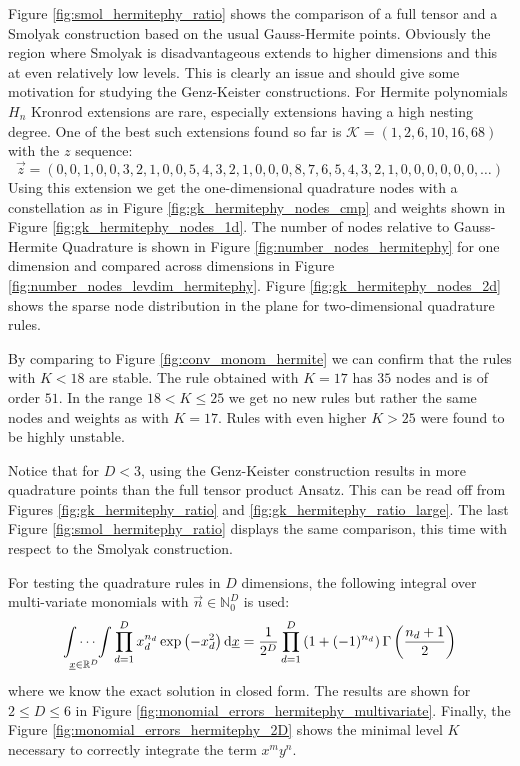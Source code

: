 \documentclass[a4paper,10pt]{article}
\begin{document}
Figure \ref{fig:smol_hermitephy_ratio} shows the comparison of a full tensor
and a Smolyak construction based on the usual Gauss-Hermite points. Obviously the region
where Smolyak is disadvantageous extends to higher dimensions and this at even relatively
low levels. This is clearly an issue and should give some motivation for studying the
Genz-Keister constructions.
For Hermite polynomials $H_n$ Kronrod extensions are rare, especially extensions
having a high nesting degree. One of the best such extensions found so far is
$\mathcal{K} = (1, 2, 6, 10, 16, 68)$ with the $z$ sequence:
\begin{equation*}
  \vec{z} = (0, 0, 1, 0, 0, 3, 2, 1, 0, 0, 5, 4, 3, 2, 1, 0, 0, 0, 8, 7,
             6, 5, 4, 3, 2, 1, 0, 0, 0, 0, 0, 0, \ldots)
\end{equation*}
Using this extension we get the one-dimensional quadrature nodes
with a constellation as in Figure \ref{fig:gk_hermitephy_nodes_cmp}
and weights shown in Figure \ref{fig:gk_hermitephy_nodes_1d}.
The number of nodes relative to Gauss-Hermite Quadrature is shown
in Figure \ref{fig:number_nodes_hermitephy} for one dimension and
compared across dimensions in Figure \ref{fig:number_nodes_levdim_hermitephy}.
Figure \ref{fig:gk_hermitephy_nodes_2d} shows the sparse
node distribution in the plane for two-dimensional quadrature rules.

By comparing to Figure \ref{fig:conv_monom_hermite} we can confirm that the
rules with $K < 18$ are stable. The rule obtained with $K=17$ has $35$ nodes
and is of order $51$. In the range $18 < K \leq 25$ we get no new rules but
rather the same nodes and weights as with $K = 17$. Rules with even higher
$K > 25$ were found to be highly unstable.

Notice that for $D < 3$, using the Genz-Keister construction results
in more quadrature points than the full tensor product Ansatz. This
can be read off from Figures \ref{fig:gk_hermitephy_ratio}
and \ref{fig:gk_hermitephy_ratio_large}. The last Figure
\ref{fig:smol_hermitephy_ratio} displays the same comparison,
this time with respect to the Smolyak construction.

For testing the quadrature rules in $D$ dimensions, the following integral
over multi-variate monomials with $\vec{n} \in \mathbb{N}_0^D$ is used:
\begin{equation} \label{eq:hermitephy_exact_solution}
  \idotsint \limits_{\underline{x} \in \mathbb{R}^D} \prod_{d=1}^D x_d^{n_d} \exp\left(-x_d^2\right) \mathrm{d}\underline{x}
  =
  \frac{1}{2^D} \prod_{d=1}^D \left(1 + (-1)^{n_d}\right) \Gamma\left(\frac{n_d + 1}{2}\right)
\end{equation}
where we know the exact solution in closed form. The results are shown
for $2 \leq D \leq 6$ in Figure \ref{fig:monomial_errors_hermitephy_multivariate}.
Finally, the Figure \ref{fig:monomial_errors_hermitephy_2D} shows the minimal
level $K$ necessary to correctly integrate the term $x^m y^n$.
\end{document}
